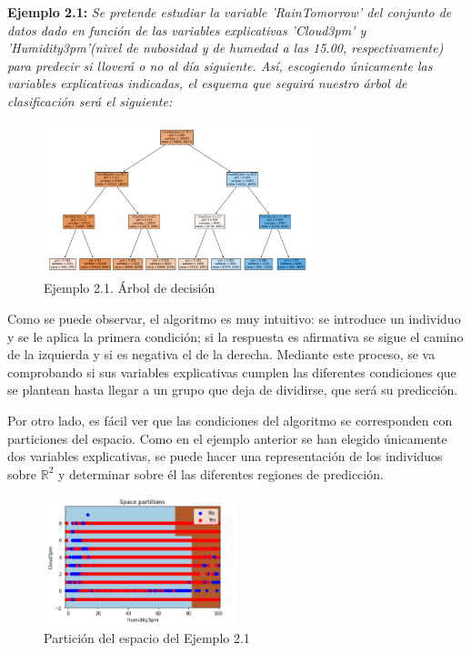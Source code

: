 \documentclass[12pt,twoside]{article}
\begin{document}
\textbf{Ejemplo 2.1: } \textit{Se pretende estudiar la variable 'RainTomorrow' del conjunto de datos dado en función de las variables explicativas 'Cloud3pm' y 'Humidity3pm'(nivel de nubosidad y de humedad a las 15.00, respectivamente) para predecir si lloverá o no al día siguiente. Así, escogiendo únicamente las variables explicativas indicadas, el esquema que seguirá nuestro árbol de clasificación será el siguiente: }
\begin{figure}[h]
	\centering
	\includegraphics[width = 0.7\textwidth]{ex2_1_01}
	\caption{Ejemplo 2.1. Árbol de decisión}
	\label{fig:Ejemplo 2.1}
\end{figure}

Como se puede observar, el algoritmo es muy intuitivo: se introduce un individuo y se le aplica la primera condición; si la respuesta es afirmativa se sigue el camino de la izquierda y si es negativa el de la derecha. Mediante este proceso, se va comprobando si sus variables explicativas cumplen las diferentes condiciones que se plantean hasta llegar a un grupo que deja de dividirse, que será su predicción.

Por otro lado, es fácil ver que las condiciones del algoritmo se corresponden con particiones del espacio. Como en el ejemplo anterior se han elegido únicamente dos variables explicativas, se puede hacer una representación de los individuos sobre $\mathbb{R}^{2}$ y determinar sobre él las diferentes regiones de predicción.
\begin{figure}[h]
	\centering
	\includegraphics[width = 0.5\textwidth]{ex2_1_02}
	\caption{Partición del espacio del Ejemplo 2.1}
	\label{fig:Ejemplo 2.1.2}
\end{figure}
\end{document}
